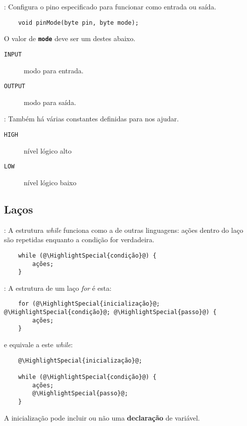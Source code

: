 \begin{frame}[fragile]{\insertsection: \insertsubsection}
  Configura o pino especificado para funcionar como entrada ou saída.
  \begin{verbatim}
    void pinMode(byte pin, byte mode);
  \end{verbatim}

  O valor de \texttt{\textbf{mode}} deve ser um destes abaixo.
  \begin{description}
    \item[\texttt{INPUT}] modo para entrada.
    \item[\texttt{OUTPUT}] modo para saída.
  \end{description}
\end{frame}


\begin{frame}{\insertsection: \insertsubsection}
  Também há várias constantes definidas para nos ajudar.
  \begin{description}
    \item[\texttt{HIGH}] nível lógico alto
    \item[\texttt{LOW}] nível lógico baixo
  \end{description}
\end{frame}


\subsection{Laços}


\begin{frame}[fragile]{\insertsection: \insertsubsection}
  A estrutura \textit{while} funciona como a de outras linguagens: ações dentro do laço são repetidas enquanto a condição for verdadeira.
  \begin{verbatim}
    while (@\HighlightSpecial{condição}@) {
    	ações;
    }
  \end{verbatim}
\end{frame}


\begin{frame}[fragile]{\insertsection: \insertsubsection}
  A estrutura de um laço \textit{for} é esta:
  \begin{verbatim}
    for (@\HighlightSpecial{inicialização}@; @\HighlightSpecial{condição}@; @\HighlightSpecial{passo}@) {
    	ações;
    }
  \end{verbatim}
  e equivale a este \textit{while}:
  \begin{verbatim}
    @\HighlightSpecial{inicialização}@;

    while (@\HighlightSpecial{condição}@) {
    	ações;
    	@\HighlightSpecial{passo}@;
    }
  \end{verbatim}

  A inicialização pode incluir ou não uma \textbf{declaração} de variável.
\end{frame}


